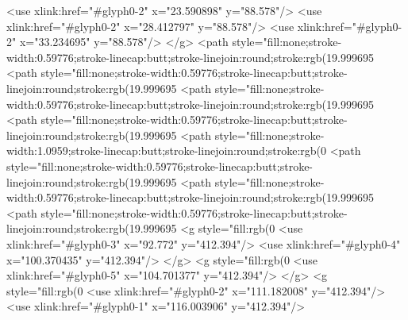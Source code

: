   <use xlink:href="#glyph0-2" x="23.590898" y="88.578"/>
  <use xlink:href="#glyph0-2" x="28.412797" y="88.578"/>
  <use xlink:href="#glyph0-2" x="33.234695" y="88.578"/>
</g>
<path style="fill:none;stroke-width:0.59776;stroke-linecap:butt;stroke-linejoin:round;stroke:rgb(19.999695%
<path style="fill:none;stroke-width:0.59776;stroke-linecap:butt;stroke-linejoin:round;stroke:rgb(19.999695%
<path style="fill:none;stroke-width:0.59776;stroke-linecap:butt;stroke-linejoin:round;stroke:rgb(19.999695%
<path style="fill:none;stroke-width:0.59776;stroke-linecap:butt;stroke-linejoin:round;stroke:rgb(19.999695%
<path style="fill:none;stroke-width:1.0959;stroke-linecap:butt;stroke-linejoin:round;stroke:rgb(0%
<path style="fill:none;stroke-width:0.59776;stroke-linecap:butt;stroke-linejoin:round;stroke:rgb(19.999695%
<path style="fill:none;stroke-width:0.59776;stroke-linecap:butt;stroke-linejoin:round;stroke:rgb(19.999695%
<path style="fill:none;stroke-width:0.59776;stroke-linecap:butt;stroke-linejoin:round;stroke:rgb(19.999695%
<g style="fill:rgb(0%
  <use xlink:href="#glyph0-3" x="92.772" y="412.394"/>
  <use xlink:href="#glyph0-4" x="100.370435" y="412.394"/>
</g>
<g style="fill:rgb(0%
  <use xlink:href="#glyph0-5" x="104.701377" y="412.394"/>
</g>
<g style="fill:rgb(0%
  <use xlink:href="#glyph0-2" x="111.182008" y="412.394"/>
  <use xlink:href="#glyph0-1" x="116.003906" y="412.394"/>
